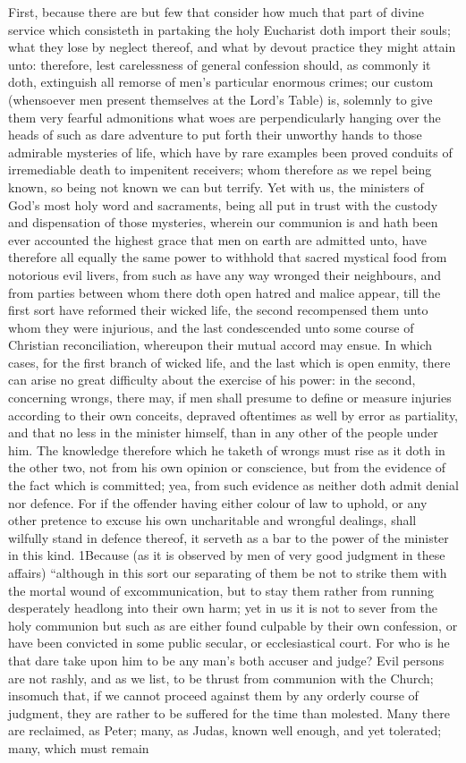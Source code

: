 First, because there are but few that consider how much that part of divine service which consisteth in partaking the holy Eucharist doth import their souls; what they lose by neglect thereof, and what by devout practice they might attain unto: therefore, lest carelessness of general confession  should, as commonly it doth, extinguish all remorse of men’s particular enormous crimes; our custom (whensoever men present themselves at the Lord’s Table) is, solemnly to give them very fearful admonitions what woes are perpendicularly hanging over the heads of such as dare adventure to put forth their unworthy hands to those admirable mysteries of life, which have by rare examples been proved conduits of irremediable death to impenitent receivers; whom therefore as we repel being known, so being not known we can but terrify. Yet with us, the ministers of God’s most holy word and sacraments, being all put in trust with the custody and dispensation of those mysteries, wherein our communion is and hath been ever accounted the highest grace that men on earth are admitted unto, have therefore all equally the same power to withhold that sacred mystical food from notorious evil livers, from such as have any way wronged their neighbours, and from parties between whom there doth open hatred and malice appear, till the first sort have reformed their wicked life, the second recompensed them unto whom they were injurious, and the last condescended unto some course of Christian reconciliation, whereupon their mutual accord may ensue. In which cases, for the first branch of wicked life, and the last which is open enmity, there can arise no great difficulty about the exercise of his power: in the second, concerning wrongs, there may, if men shall presume to define or measure injuries according to their own conceits, depraved oftentimes as well by error as partiality, and that no less in the minister himself, than in any other of the people under him. The knowledge therefore which he taketh of wrongs must rise as it doth in the other two, not from his own opinion or conscience, but from the evidence of the fact which is committed; yea, from such evidence as neither doth admit denial nor defence. For if the offender having either colour of law to uphold, or any other pretence to excuse his own uncharitable and wrongful dealings, shall wilfully stand in defence thereof, it serveth as a bar to the power of the minister in this kind. 1Because (as it is observed by men  of very good judgment in these affairs) “although in this sort our separating of them be not to strike them with the mortal wound of excommunication, but to stay them rather from running desperately headlong into their own harm; yet in us it is not to sever from the holy communion but such as are either found culpable by their own confession, or have been convicted in some public secular, or ecclesiastical court. For who is he that dare take upon him to be any man’s both accuser and judge? Evil persons are not rashly, and as we list, to be thrust from communion with the Church; insomuch that, if we cannot proceed against them by any orderly course of judgment, they are rather to be suffered for the time than molested. Many there are reclaimed, as Peter; many, as Judas, known well enough, and yet tolerated; many, which must remain 